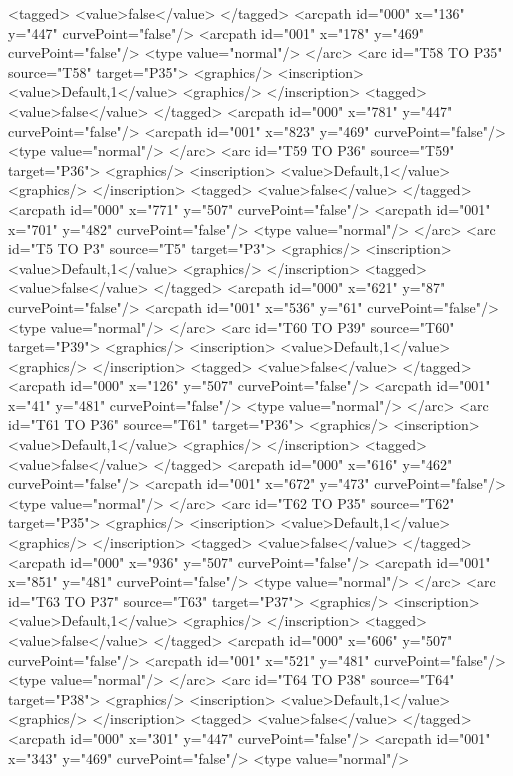 <tagged>
<value>false</value>
</tagged>
<arcpath id="000" x="136" y="447" curvePoint="false"/>
<arcpath id="001" x="178" y="469" curvePoint="false"/>
<type value="normal"/>
</arc>
<arc id="T58 TO P35" source="T58" target="P35">
<graphics/>
<inscription>
<value>Default,1</value>
<graphics/>
</inscription>
<tagged>
<value>false</value>
</tagged>
<arcpath id="000" x="781" y="447" curvePoint="false"/>
<arcpath id="001" x="823" y="469" curvePoint="false"/>
<type value="normal"/>
</arc>
<arc id="T59 TO P36" source="T59" target="P36">
<graphics/>
<inscription>
<value>Default,1</value>
<graphics/>
</inscription>
<tagged>
<value>false</value>
</tagged>
<arcpath id="000" x="771" y="507" curvePoint="false"/>
<arcpath id="001" x="701" y="482" curvePoint="false"/>
<type value="normal"/>
</arc>
<arc id="T5 TO P3" source="T5" target="P3">
<graphics/>
<inscription>
<value>Default,1</value>
<graphics/>
</inscription>
<tagged>
<value>false</value>
</tagged>
<arcpath id="000" x="621" y="87" curvePoint="false"/>
<arcpath id="001" x="536" y="61" curvePoint="false"/>
<type value="normal"/>
</arc>
<arc id="T60 TO P39" source="T60" target="P39">
<graphics/>
<inscription>
<value>Default,1</value>
<graphics/>
</inscription>
<tagged>
<value>false</value>
</tagged>
<arcpath id="000" x="126" y="507" curvePoint="false"/>
<arcpath id="001" x="41" y="481" curvePoint="false"/>
<type value="normal"/>
</arc>
<arc id="T61 TO P36" source="T61" target="P36">
<graphics/>
<inscription>
<value>Default,1</value>
<graphics/>
</inscription>
<tagged>
<value>false</value>
</tagged>
<arcpath id="000" x="616" y="462" curvePoint="false"/>
<arcpath id="001" x="672" y="473" curvePoint="false"/>
<type value="normal"/>
</arc>
<arc id="T62 TO P35" source="T62" target="P35">
<graphics/>
<inscription>
<value>Default,1</value>
<graphics/>
</inscription>
<tagged>
<value>false</value>
</tagged>
<arcpath id="000" x="936" y="507" curvePoint="false"/>
<arcpath id="001" x="851" y="481" curvePoint="false"/>
<type value="normal"/>
</arc>
<arc id="T63 TO P37" source="T63" target="P37">
<graphics/>
<inscription>
<value>Default,1</value>
<graphics/>
</inscription>
<tagged>
<value>false</value>
</tagged>
<arcpath id="000" x="606" y="507" curvePoint="false"/>
<arcpath id="001" x="521" y="481" curvePoint="false"/>
<type value="normal"/>
</arc>
<arc id="T64 TO P38" source="T64" target="P38">
<graphics/>
<inscription>
<value>Default,1</value>
<graphics/>
</inscription>
<tagged>
<value>false</value>
</tagged>
<arcpath id="000" x="301" y="447" curvePoint="false"/>
<arcpath id="001" x="343" y="469" curvePoint="false"/>
<type value="normal"/>
